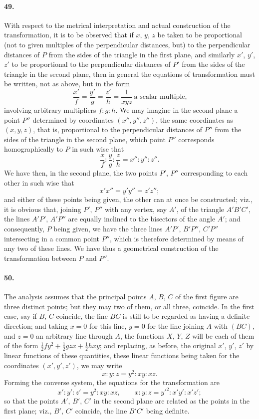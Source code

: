 \documentclass[11pt]{article}
\begin{document}
\paragraph{49.}
With respect to the metrical interpretation and actual construction of
the transformation, it is to be observed that if $x$, $y$, $z$ be taken
to be proportional (not to given multiples of the perpendicular distances,
but) to the perpendicular distances of $P$ from the sides of the triangle
in the first plane, and similarly $x'$, $y'$, $z'$ to be proportional to
the perpendicular distances of $P'$ from the sides of the triangle in the
second plane, then in general the equations of transformation must be
written, not as above, but in the form
\[
\frac{x'}{f}=\frac{y'}{g}=\frac{z'}{h}=\frac{1}{xyz}\ \text{a scalar
multiple,}
\]
involving arbitrary multipliers $f:g:h$. We may imagine in the second
plane a point $P''$ determined by coordinates $(x'',y'',z'')$, the same
coordinates as $(x,y,z)$, that is, proportional to the perpendicular
distances of $P''$ from the sides of the triangle in the second plane,
which point $P''$ corresponds homographically to $P$ in such wise that
\[
\frac{x}{f}:\frac{y}{g}:\frac{z}{h} = x'':y'':z''.
\]
We have then, in the second plane, the two points $P'$, $P''$
corresponding to each other in such wise that
\[
x'x''=y'y''=z'z'';
\]
and either of these points being given, the other can at once be
constructed; viz., it is obvious that, joining $P'$, $P''$ with any
vertex, say $A'$, of the triangle $A'B'C'$, the lines $A'P'$, $A'P''$ are
equally inclined to the bisectors of the angle $A'$; and consequently,
$P$ being given, we have the three lines $A'P'$, $B'P''$, $C'P''$
intersecting in a common point $P''$, which is therefore determined by
means of any two of these lines. We have thus a geometrical construction
of the transformation between $P$ and $P''$.

\medskip

\paragraph{50.}
The analysis assumes that the principal points $A$, $B$, $C$ of the first
figure are three distinct points; but they may two of them, or all three,
coincide. In the first case, say if $B$, $C$ coincide, the line $BC$ is
still to be regarded as having a definite direction; and taking $x=0$ for
this line, $y=0$ for the line joining $A$ with $(BC)$, and $z=0$ an
arbitrary line through $A$, the functions $X$, $Y$, $Z$ will be each of
them of the form $\tfrac{1}{2}fy^{2}+\tfrac{1}{2}gzx+\tfrac{1}{2}hxy$;
and replacing, as before, the original $x'$, $y'$, $z'$ by linear
functions of these quantities, these linear functions being taken for the
coordinates $(x',y',z')$, we may write
\[
x:y:z = y^{2}:xy:xz.
\]
Forming the converse system, the equations for the transformation are
\[
x':y':z' = y^{2}:xy:xz,\qquad x:y:z = y'^{2}:x'y':x'z';
\]
so that the points $A'$, $B'$, $C'$ in the second plane are related as
the points in the first plane; viz., $B'$, $C'$ coincide, the line $B'C'$
being definite.
\end{document}
